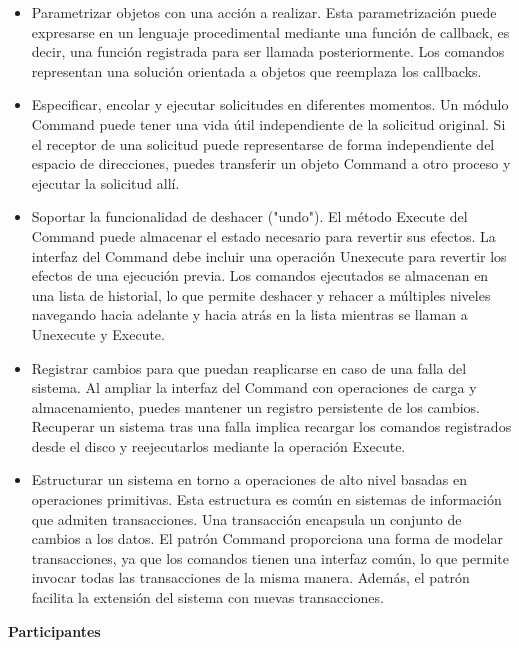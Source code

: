 \begin{itemize}
\item Parametrizar objetos con una acción a realizar. Esta parametrización puede expresarse en un lenguaje procedimental mediante una función de callback, es decir, una función registrada para ser llamada posteriormente. Los comandos representan una solución orientada a objetos que reemplaza los callbacks.

\item Especificar, encolar y ejecutar solicitudes en diferentes momentos. Un módulo Command puede tener una vida útil independiente de la solicitud original. Si el receptor de una solicitud puede representarse de forma independiente del espacio de direcciones, puedes transferir un objeto Command a otro proceso y ejecutar la solicitud allí.

\item Soportar la funcionalidad de deshacer ("undo"). El método Execute del Command puede almacenar el estado necesario para revertir sus efectos. La interfaz del Command debe incluir una operación Unexecute para revertir los efectos de una ejecución previa. Los comandos ejecutados se almacenan en una lista de historial, lo que permite deshacer y rehacer a múltiples niveles navegando hacia adelante y hacia atrás en la lista mientras se llaman a Unexecute y Execute.

\item Registrar cambios para que puedan reaplicarse en caso de una falla del sistema. Al ampliar la interfaz del Command con operaciones de carga y almacenamiento, puedes mantener un registro persistente de los cambios. Recuperar un sistema tras una falla implica recargar los comandos registrados desde el disco y reejecutarlos mediante la operación Execute.

\item Estructurar un sistema en torno a operaciones de alto nivel basadas en operaciones primitivas. Esta estructura es común en sistemas de información que admiten transacciones. Una transacción encapsula un conjunto de cambios a los datos. El patrón Command proporciona una forma de modelar transacciones, ya que los comandos tienen una interfaz común, lo que permite invocar todas las transacciones de la misma manera. Además, el patrón facilita la extensión del sistema con nuevas transacciones.
\end{itemize}


\textbf{Participantes}

